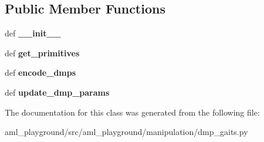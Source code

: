 \subsection*{Public Member Functions}
\begin{DoxyCompactItemize}
\item 
\hypertarget{classaml__playground_1_1manipulation_1_1dmp__gaits_1_1_d_m_p_gaits_a88352d582545bf69229b033410c91529}{def {\bfseries \-\_\-\-\_\-init\-\_\-\-\_\-}}\label{classaml__playground_1_1manipulation_1_1dmp__gaits_1_1_d_m_p_gaits_a88352d582545bf69229b033410c91529}

\item 
\hypertarget{classaml__playground_1_1manipulation_1_1dmp__gaits_1_1_d_m_p_gaits_adb479bd36a13cb6ecba11a08c608fdef}{def {\bfseries get\-\_\-primitives}}\label{classaml__playground_1_1manipulation_1_1dmp__gaits_1_1_d_m_p_gaits_adb479bd36a13cb6ecba11a08c608fdef}

\item 
\hypertarget{classaml__playground_1_1manipulation_1_1dmp__gaits_1_1_d_m_p_gaits_a799da05eecb28f2e06f9429bbbf6c1b3}{def {\bfseries encode\-\_\-dmps}}\label{classaml__playground_1_1manipulation_1_1dmp__gaits_1_1_d_m_p_gaits_a799da05eecb28f2e06f9429bbbf6c1b3}

\item 
\hypertarget{classaml__playground_1_1manipulation_1_1dmp__gaits_1_1_d_m_p_gaits_a77020c44659784c7b66f1a9a766b5d7c}{def {\bfseries update\-\_\-dmp\-\_\-params}}\label{classaml__playground_1_1manipulation_1_1dmp__gaits_1_1_d_m_p_gaits_a77020c44659784c7b66f1a9a766b5d7c}

\end{DoxyCompactItemize}


The documentation for this class was generated from the following file\-:\begin{DoxyCompactItemize}
\item 
aml\-\_\-playground/src/aml\-\_\-playground/manipulation/dmp\-\_\-gaits.\-py\end{DoxyCompactItemize}
